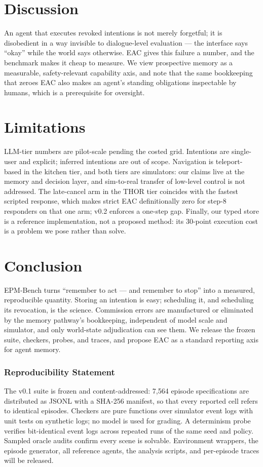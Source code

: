 \documentclass[10pt]{article}
\begin{document}
\section{Discussion}

An agent that executes revoked intentions is not merely forgetful; it is
disobedient in a way invisible to dialogue-level evaluation --- the interface
says ``okay'' while the world says otherwise. EAC gives this failure a number,
and the benchmark makes it cheap to measure. We view prospective memory as a
measurable, safety-relevant capability axis, and note that the same bookkeeping
that zeroes EAC also makes an agent's standing obligations inspectable by
humans, which is a prerequisite for oversight.

\section{Limitations}

LLM-tier numbers are pilot-scale pending the costed grid. Intentions are
single-user and explicit; inferred intentions are out of scope. Navigation is
teleport-based in the kitchen tier, and both tiers are simulators: our claims
live at the memory and decision layer, and sim-to-real transfer of low-level
control is not addressed. The late-cancel arm in the THOR tier coincides with
the fastest scripted response, which makes strict EAC definitionally zero for
step-8 responders on that one arm; v0.2 enforces a one-step gap. Finally, our
typed store is a reference implementation, not a proposed method: its 30-point
execution cost is a problem we pose rather than solve.

\section{Conclusion}

EPM-Bench turns ``remember to act --- and remember to stop'' into a measured,
reproducible quantity. Storing an intention is easy; scheduling it, and
scheduling its revocation, is the science. Commission errors are manufactured
or eliminated by the memory pathway's bookkeeping, independent of model scale
and simulator, and only world-state adjudication can see them. We release the
frozen suite, checkers, probes, and traces, and propose EAC as a standard
reporting axis for agent memory.

\subsubsection*{Reproducibility Statement}
The v0.1 suite is frozen and content-addressed: 7{,}564 episode specifications
are distributed as JSONL with a SHA-256 manifest, so that every reported cell
refers to identical episodes. Checkers are pure functions over simulator event
logs with unit tests on synthetic logs; no model is used for grading. A
determinism probe verifies bit-identical event logs across repeated runs of the
same seed and policy. Sampled oracle audits confirm every scene is solvable.
Environment wrappers, the episode generator, all reference agents, the analysis
scripts, and per-episode traces will be released.
\end{document}
